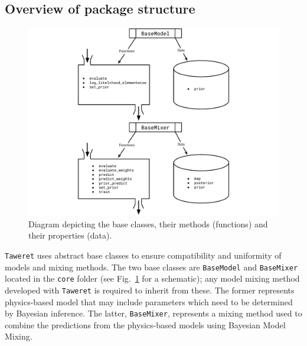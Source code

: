 \documentclass[10pt, preprint,aps,prc,floatfix,
tightenlines,
nofootinbib,superscriptaddress]{revtex4-2}
\begin{document}
\subsection{Overview of package structure}
\begin{figure}
    \centering
    \includegraphics[width=\textwidth]{base-classes.pdf}
    \caption{Diagram depicting the base classes, their methods (functions) and their properties (data).}
    \label{fig:codediagram}
\end{figure}

\texttt{Taweret} uses abstract base classes to ensure compatibility and uniformity of models and mixing methods. 
The two base classes are \texttt{BaseModel} and \texttt{BaseMixer} located in the \texttt{core} folder (see Fig.~\ref{fig:codediagram} for a schematic); any model mixing method developed with \texttt{Taweret} is required to inherit from these.
The former represents physics-based model that may include parameters which need to be determined by Bayesian inference.
The latter, \texttt{BaseMixer}, represents a mixing method used to combine the predictions from the physics-based models using Bayesian Model Mixing.
\end{document}
